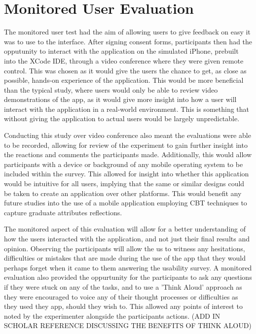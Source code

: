 \documentclass{l4proj}
\begin{document}
\section{Monitored User Evaluation}

The monitored user test had the aim of allowing users to give feedback on easy it was to use to the interface. 
After signing consent forms, participants then had the opputunity to interact with the application on the simulated iPhone, 
prebuilt into the XCode IDE, through a video conference where they were given remote control. This was chosen as it 
would give the users the chance to get, as close as possible, hands-on experience of the application. This would be 
more beneficial than the typical study, where users would only be able to review video demonstrations of the app, as 
it would give more insight into how a user will interact with the application in a real-world environment. This 
is something that without giving the application to actual users would be largely unpredictable. 
\par 
Conducting this study over video conference also meant the evaluations were able to be recorded, allowing for review 
of the experiment to gain further insight into the reactions and comments the participants made. 
Additionally, this would allow participants with a device or background of any mobile operating system to 
be included within the survey. This allowed for insight into whether this application would be intuitive for all 
users, implying that the same or similar designs could be taken to create an application over other platforms. This
would benefit any future studies into the use of a mobile application employing CBT techniques to capture graduate attributes 
reflections. 
\par 
The monitored aspect of this evaluation will allow for a better understanding of how the users interacted
with the application, and not just their final results and opinion. Observing the participants will allow the us to 
witness any hesitations, difficulties or mistakes that are made during the use of the app that they would 
perhaps forget when it came to them answering the usability survey. A monitored evaluation also provided the oppurtunity
for the participants to ask any questions if they were stuck on any of the tasks, and 
to use a 'Think Aloud' approach as they were encouraged to voice any of their thought processes
or difficulties as they used they app, should they wish to. This allowed any points of interest to noted by the 
experimenter alongside the participants actions. (ADD IN SCHOLAR REFERENCE DISCUSSING THE BENEFITS OF THINK ALOUD)
\end{document}
